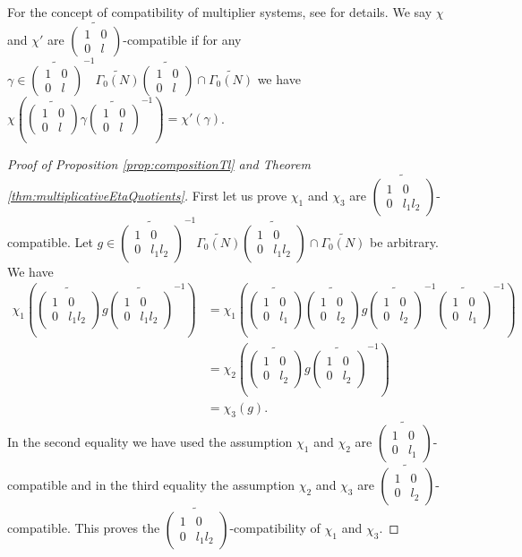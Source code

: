 \documentclass[12pt]{amsart}
\numberwithin{equation}{section}
\theoremstyle{plain}
\theoremstyle{definition}
\theoremstyle{remark}
\newcommand\tbtmat[4]{\left(\begin{smallmatrix}{#1} & {#2} \\ {#3} & {#4}\end{smallmatrix}\right)}
\begin{document}
For the concept of compatibility of multiplier systems, see \cite[Lemma 3.1]{ZZ23} for details. We say $\chi$ and $\chi'$ are $\widetilde{\tbtmat{1}{0}{0}{l}}$-compatible if for any $\gamma\in\widetilde{\tbtmat{1}{0}{0}{l}}^{-1}\widetilde{\Gamma_0(N)}\widetilde{\tbtmat{1}{0}{0}{l}}\cap\widetilde{\Gamma_0(N)}$ we have $\chi\left(\widetilde{\tbtmat{1}{0}{0}{l}}\gamma\widetilde{\tbtmat{1}{0}{0}{l}}^{-1}\right)=\chi'(\gamma)$.
\begin{proof}[Proof of Proposition \ref{prop:compositionTl} and Theorem \ref{thm:multiplicativeEtaQuotients}]
First let us prove $\chi_1$ and $\chi_3$ are $\widetilde{\tbtmat{1}{0}{0}{l_1l_2}}$-compatible. Let $g\in\widetilde{\tbtmat{1}{0}{0}{l_1l_2}}^{-1}\widetilde{\Gamma_0(N)}\widetilde{\tbtmat{1}{0}{0}{l_1l_2}}\cap\widetilde{\Gamma_0(N)}$ be arbitrary. We have
\begin{align*}
\chi_1\left(\widetilde{\tbtmat{1}{0}{0}{l_1l_2}}g\widetilde{\tbtmat{1}{0}{0}{l_1l_2}}^{-1}\right)&=\chi_1\left(\widetilde{\tbtmat{1}{0}{0}{l_1}}\widetilde{\tbtmat{1}{0}{0}{l_2}}g\widetilde{\tbtmat{1}{0}{0}{l_2}}^{-1}\widetilde{\tbtmat{1}{0}{0}{l_1}}^{-1}\right)\\
&=\chi_2\left(\widetilde{\tbtmat{1}{0}{0}{l_2}}g\widetilde{\tbtmat{1}{0}{0}{l_2}}^{-1}\right)\\
&=\chi_3(g).
\end{align*}
In the second equality we have used the assumption $\chi_1$ and $\chi_2$ are $\widetilde{\tbtmat{1}{0}{0}{l_1}}$-compatible and in the third equality the assumption $\chi_2$ and $\chi_3$ are $\widetilde{\tbtmat{1}{0}{0}{l_2}}$-compatible. This proves the $\widetilde{\tbtmat{1}{0}{0}{l_1l_2}}$-compatibility of $\chi_1$ and $\chi_3$.


\end{proof}
\end{document}
